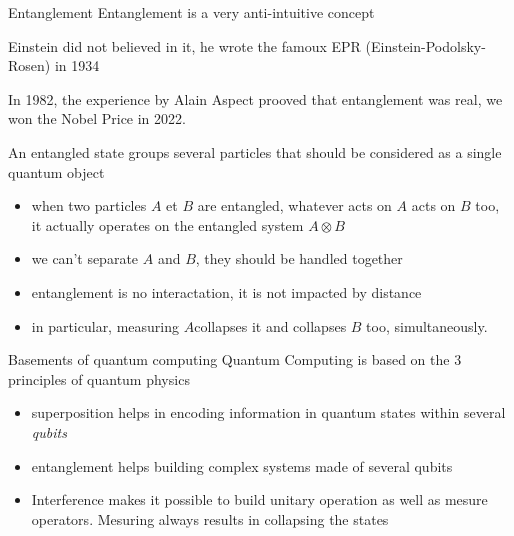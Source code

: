 \begin{frame}{Entanglement}
Entanglement is a very anti-intuitive concept\newline

Einstein did not believed in it, he wrote the famoux EPR (Einstein-Podolsky-Rosen) in 1934\newline

In 1982, the experience by Alain Aspect prooved that entanglement was real, we won the Nobel Price in 2022. \newline

An entangled state groups several particles that should be considered as a single quantum object
\begin{itemize}
    \item when two particles $A$ et $B$ are entangled, whatever acts on $A$ acts on  $B$ too, it actually operates on 
    the entangled system $A \otimes B$
    \item we can't separate $A$ and $B$, they should be handled together
    \item entanglement is no interactation, it is not impacted by distance
    \item in particular, measuring $A$collapses it and collapses $B$ too, simultaneously. 
\end{itemize}
\end{frame}

\begin{frame}{Basements of quantum computing}
Quantum Computing is based on the 3 principles of quantum physics
\begin{itemize}
    \item superposition helps in encoding information in quantum states within several \textit{qubits}
    \item entanglement helps building complex systems made of several qubits
    \item Interference makes it possible to build unitary operation as well as mesure operators. Mesuring always results
    in collapsing the states
\end{itemize}
\end{frame}

